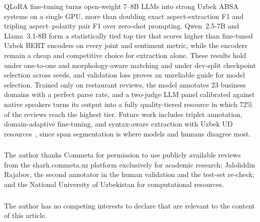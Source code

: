 \documentclass[runningheads]{llncs}
\begin{document}
QLoRA fine-tuning turns open-weight 7--8B LLMs into strong Uzbek ABSA systems on a single GPU, more than doubling exact aspect-extraction F1 and tripling aspect--polarity pair F1 over zero-shot prompting. Qwen~2.5-7B and Llama~3.1-8B form a statistically tied top tier that scores higher than fine-tuned Uzbek BERT encoders on every joint and sentiment metric, while the encoders remain a cheap and competitive choice for extraction alone. These results hold under one-to-one and morphology-aware matching and under dev-split checkpoint selection across seeds, and validation loss proves an unreliable guide for model selection. Trained only on restaurant reviews, the model annotates 23 business domains with a perfect parse rate, and a two-judge LLM panel calibrated against native speakers turns its output into a fully quality-tiered resource in which 72\% of the reviews reach the highest tier. Future work includes triplet annotation, domain-adaptive fine-tuning, and syntax-aware extraction with Uzbek UD resources~\cite{MATLATIPOV2026112857,11632281}, since span segmentation is where models and humans disagree most.

\begin{credits}
\subsubsection{\ackname} The author thanks Commeta for permission to use publicly available reviews from the sharh.commeta.uz platform exclusively for academic research; Jaloliddin Rajabov, the second annotator in the human validation and the test-set re-check; and the National University of Uzbekistan for computational resources.

\subsubsection{\discintname} The author has no competing interests to declare that are relevant to the content of this article.
\end{credits}
%
%
%


%
\end{document}
